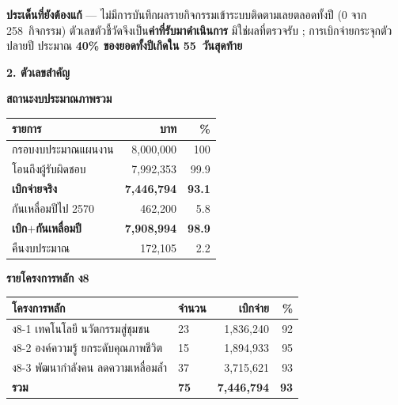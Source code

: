 \documentclass[11pt]{article}
\newcommand{\sechead}[1]{%
  \vspace{5pt}
  {\color{FirstBlue}\fontsize{13.5}{16}\selectfont\bfseries #1}%
  \par\vspace{-3pt}{\color{rpfgold}\rule{\linewidth}{1.2pt}}\par\vspace{2pt}}
\newenvironment{flagbox}[1]{%
  \colorlet{flagbar}{#1}%
  \par\vspace{3pt}\noindent
  \begin{lrbox}{\flagbuf}%
  \begin{minipage}{\dimexpr\linewidth-0.85cm\relax}\RaggedRight\small\vspace{3pt}}%
  {\vspace{3pt}\end{minipage}\end{lrbox}%
  \colorbox{flagbar!6}{\makebox[\dimexpr\linewidth-2\fboxsep\relax][l]{%
    \textcolor{flagbar}{\rule[-\dimexpr\dp\flagbuf+3pt\relax]{2.6pt}{\dimexpr\ht\flagbuf+\dp\flagbuf+6pt\relax}}%
    \hspace{5pt}\usebox{\flagbuf}}}\par\vspace{3pt}}
\begin{document}
\begin{flagbox}{warnred}
\textbf{ประเด็นที่ยังต้องแก้} --- ไม่มีการบันทึกผลรายกิจกรรมเข้าระบบติดตามเลยตลอดทั้งปี
(0 จาก 258~กิจกรรม) ตัวเลขตัวชี้วัดจึงเป็น\textbf{ค่าที่รับมาดำเนินการ} มิใช่ผลที่ตรวจรับ ;
การเบิกจ่ายกระจุกตัวปลายปี ประมาณ \textbf{40\% ของยอดทั้งปีเกิดใน 55~วันสุดท้าย}
\end{flagbox}

\sechead{2. ตัวเลขสำคัญ}

\begin{minipage}[t]{0.485\textwidth}
{\footnotesize\textbf{\color{FirstBlue}สถานะงบประมาณภาพรวม}}\par\vspace{2pt}
\small
\begin{tabular}{L{3.55cm}rr}
\toprule
{}
\textbf{รายการ} & \textbf{บาท} & \textbf{\%}\\
\midrule
กรอบงบประมาณแผนงาน & 8,000,000 & 100\\
โอนถึงผู้รับผิดชอบ & 7,992,353 & 99.9\\
\textbf{เบิกจ่ายจริง} & \textbf{7,446,794} & \textbf{93.1}\\
กันเหลื่อมปีไป 2570 & 462,200 & 5.8\\
\textbf{เบิก$+$กันเหลื่อมปี} & \textbf{7,908,994} & \textbf{98.9}\\
คืนงบประมาณ & 172,105 & 2.2\\
\bottomrule
\end{tabular}
\end{minipage}\hfill
\begin{minipage}[t]{0.485\textwidth}
{\footnotesize\textbf{\color{FirstBlue}รายโครงการหลัก ง8}}\par\vspace{2pt}
\small
\begin{tabular}{L{2.75cm}C{0.75cm}rr}
\toprule
{}
\textbf{โครงการหลัก} & \textbf{จำนวน} & \textbf{เบิกจ่าย} & \textbf{\%}\\
\midrule
ง8-1 เทคโนโลยี นวัตกรรมสู่ชุมชน & 23 & 1,836,240 & 92\\
ง8-2 องค์ความรู้ ยกระดับคุณภาพชีวิต & 15 & 1,894,933 & 95\\
ง8-3 พัฒนากำลังคน ลดความเหลื่อมล้ำ & 37 & 3,715,621 & 93\\
\midrule
{}
\textbf{รวม} & \textbf{75} & \textbf{7,446,794} & \textbf{93}\\
\bottomrule
\end{tabular}
\end{minipage}
\end{document}
